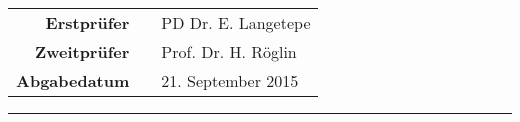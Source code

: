 \begin{titlepage}
\vspace{1.5cm}
\begin{center}
    \begin{tabulary}{\textwidth}{ RCL }
        \textbf{Erstprüfer} & & PD Dr. E. Langetepe \\
        \textbf{Zweitprüfer} & & Prof. Dr. H. Röglin \\
        \textbf{Abgabedatum} & & 21. September 2015
    \end{tabulary}
\end{center}

\vspace{1cm}
\vfill
\rule{\textwidth}{0.4pt}

\end{titlepage}
